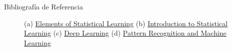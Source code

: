 \documentclass[usenames,dvipsnames]{beamer} %
\begin{document}
\begin{frame}{Bibliograf\'ia de Referencia}
    
    \begin{figure}\label{fig:book_covers}
    \centering
    \caption{(a) \href{https://web.stanford.edu/~hastie/ElemStatLearn/}{Elements of Statistical Learning} (b) \href{http://www-bcf.usc.edu/~gareth/ISL/}{Introduction to Statistical Learning} (c) \href{http://www.deeplearningbook.org/}{Deep Learning} (d) \href{https://www.microsoft.com/en-us/research/people/cmbishop/\#!prml-book}{Pattern Recognition and Machine Learning}}
    \end{figure}
\end{frame}
\end{document}
